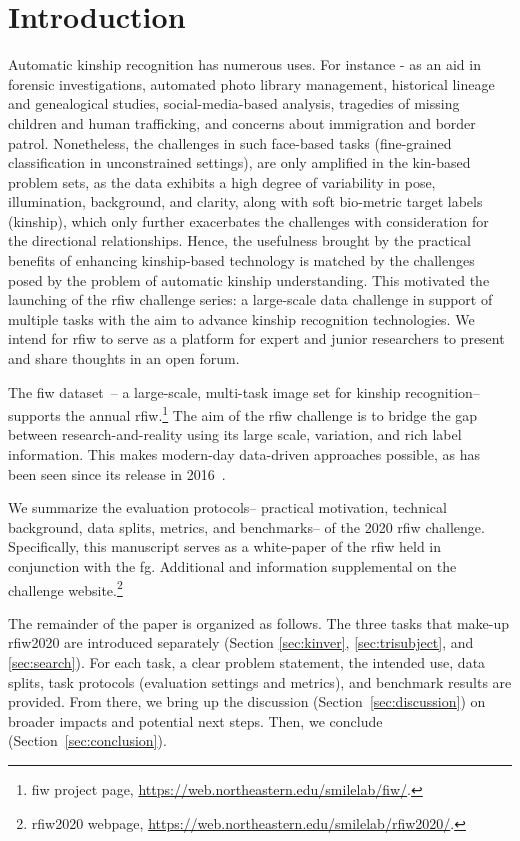\section{Introduction}
Automatic kinship recognition has numerous uses. For instance - as an aid in forensic investigations, automated photo library management, historical lineage and genealogical studies, social-media-based analysis, tragedies of missing children and human trafficking, and concerns about immigration and border patrol. Nonetheless, the challenges in such face-based tasks (\ie fine-grained classification in unconstrained settings), are only amplified in the kin-based problem sets, as the data exhibits a high degree of variability in pose, illumination, background, and clarity,  along with soft bio-metric target labels (\ie kinship), which only further exacerbates the challenges with consideration for the directional relationships. Hence, the usefulness brought by the  practical benefits of enhancing kinship-based technology is matched by the challenges posed by the problem of automatic kinship understanding. This motivated the launching of the \ac{rfiw} challenge series: a large-scale data challenge in support of multiple tasks with the aim to advance kinship recognition technologies. We intend for \ac{rfiw} to serve as a platform for expert and junior researchers to present and share thoughts in an open forum.

The \ac{fiw} dataset~\cite{robinson2016families, robinson2018visual, wang2017kinship}-- a large-scale, multi-task image set for kinship recognition-- supports the annual \ac{rfiw}.\footnote{\ac{fiw} project page, \href{https://web.northeastern.edu/smilelab/fiw/}{https://web.northeastern.edu/smilelab/fiw/}.} The aim of the \ac{rfiw} challenge is to bridge the gap between research-and-reality using its large scale, variation, and rich label information. This makes modern-day data-driven approaches possible, as has been seen since its release in 2016~\cite{AdvNet, ertugrul2017will, gao2019will, li2017kinnet, wu2018kinship}.

We summarize the evaluation protocols-- practical motivation, technical background, data splits, metrics, and benchmarks-- of the 2020 \ac{rfiw} challenge. Specifically, this manuscript serves as a white-paper of the \ac{rfiw} held in conjunction with the \ac{fg}. Additional and information supplemental on the challenge website.\footnote{\ac{rfiw}2020 webpage, \href{https://web.northeastern.edu/smilelab/rfiw2020/}{https://web.northeastern.edu/smilelab/rfiw2020/}.} 

The remainder of the paper is organized as follows. The three tasks that make-up \ac{rfiw}2020 are introduced separately (Section \ref{sec:kinver}, \ref{sec:trisubject}, and \ref{sec:search}). For each task, a clear problem statement, the intended use, data splits, task protocols (\ie evaluation settings and metrics), and benchmark results are provided. From there, we bring up the discussion (Section~\ref{sec:discussion}) on broader impacts and potential next steps. Then, we conclude (Section~\ref{sec:conclusion}).
